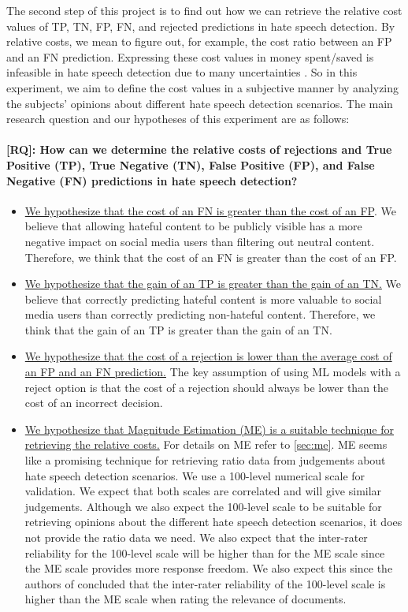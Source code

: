 \documentclass[a4paper]{article}
\begin{document}
The second step of this project is to find out how we can retrieve the relative cost values of TP, TN, FP, FN, and rejected predictions in hate speech detection. By relative costs, we mean to figure out, for example, the cost ratio between an FP and an FN prediction. Expressing these cost values in money spent/saved is infeasible in hate speech detection due to many uncertainties \cite{sunstein2018does}. So in this experiment, we aim to define the cost values in a subjective manner by analyzing the subjects' opinions about different hate speech detection scenarios. The main research question and our hypotheses of this experiment are as follows:

\paragraph{[RQ]: How can we determine the relative costs of rejections and True Positive (TP), True Negative (TN), False Positive (FP), and False Negative (FN) predictions in hate speech detection?}
\begin{itemize}
    \item \underline{We hypothesize that the cost of an FN is greater than the cost of an FP}. We believe that allowing hateful content to be publicly visible has a more negative impact on social media users than filtering out neutral content. Therefore, we think that the cost of an FN is greater than the cost of an FP.
    \item \underline{We hypothesize that the gain of an TP is greater than the gain of an TN.} We believe that correctly predicting hateful content is more valuable to social media users than correctly predicting non-hateful content. Therefore, we think that the gain of an TP is greater than the gain of an TN.
    \item \underline{We hypothesize that the cost of a rejection is lower than the average cost of an FP and an FN prediction.} The key assumption of using ML models with a reject option is that the cost of a rejection should always be lower than the cost of an incorrect decision.
    \item \underline{We hypothesize that Magnitude Estimation (ME) is a suitable technique for retrieving the relative costs.} For details on ME refer to \ref{sec:me}. ME seems like a promising technique for retrieving ratio data from judgements about hate speech detection scenarios. We use a 100-level numerical scale for validation. We expect that both scales are correlated and will give similar judgements. Although we also expect the 100-level scale to be suitable for retrieving opinions about the different hate speech detection scenarios, it does not provide the ratio data we need. We also expect that the inter-rater reliability for the 100-level scale will be higher than for the ME scale since the ME scale provides more response freedom. We also expect this since the authors of \cite{roitero2018fine} concluded that the inter-rater reliability of the 100-level scale is higher than the ME scale when rating the relevance of documents.
\end{itemize}
\end{document}
